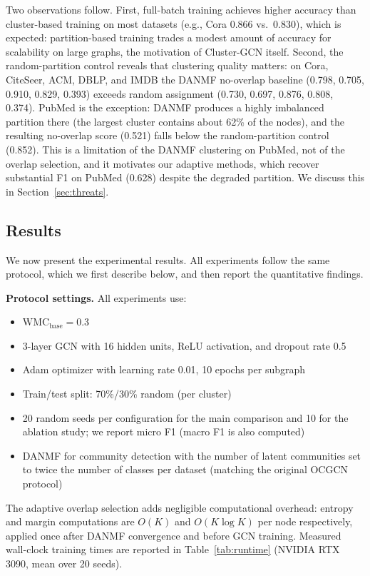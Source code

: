 \documentclass[pdflatex,sn-mathphys-num]{sn-jnl}%
\theoremstyle{thmstyleone}%
\theoremstyle{thmstyletwo}%
\theoremstyle{thmstylethree}%
\begin{document}
Two observations follow. First, full-batch training achieves higher accuracy than cluster-based training on most datasets (e.g., Cora 0.866 vs.\ 0.830), which is expected: partition-based training trades a modest amount of accuracy for scalability on large graphs, the motivation of Cluster-GCN itself. Second, the random-partition control reveals that clustering quality matters: on Cora, CiteSeer, ACM, DBLP, and IMDB the DANMF no-overlap baseline (0.798, 0.705, 0.910, 0.829, 0.393) exceeds random assignment (0.730, 0.697, 0.876, 0.808, 0.374). PubMed is the exception: DANMF produces a highly imbalanced partition there (the largest cluster contains about 62\% of the nodes), and the resulting no-overlap score (0.521) falls below the random-partition control (0.852). This is a limitation of the DANMF clustering on PubMed, not of the overlap selection, and it motivates our adaptive methods, which recover substantial F1 on PubMed (0.628) despite the degraded partition. We discuss this in Section~\ref{sec:threats}.

\subsection{Results}
\label{sec:results}

We now present the experimental results. 
All experiments follow the same protocol, which we first describe below, and then report the quantitative findings.

\textbf{Protocol settings.}
All experiments use:
\begin{itemize}
  \item $\mathrm{WMC}_{\mathrm{base}} = 0.3$
  \item 3-layer GCN with 16 hidden units, ReLU activation, and dropout rate 0.5
  \item Adam optimizer with learning rate 0.01, 10 epochs per subgraph
  \item Train/test split: 70\%/30\% random (per cluster)
  \item 20 random seeds per configuration for the main comparison and 10 for the ablation study; we report micro F1 (macro F1 is also computed)
  \item DANMF for community detection with the number of latent communities set to twice the number of classes per dataset (matching the original OCGCN protocol)
\end{itemize}

The adaptive overlap selection adds negligible computational overhead: entropy and margin computations are $O(K)$ and $O(K \log K)$ per node respectively, applied once after DANMF convergence and before GCN training.
Measured wall-clock training times are reported in Table~\ref{tab:runtime} (NVIDIA RTX 3090, mean over 20 seeds).
\end{document}
